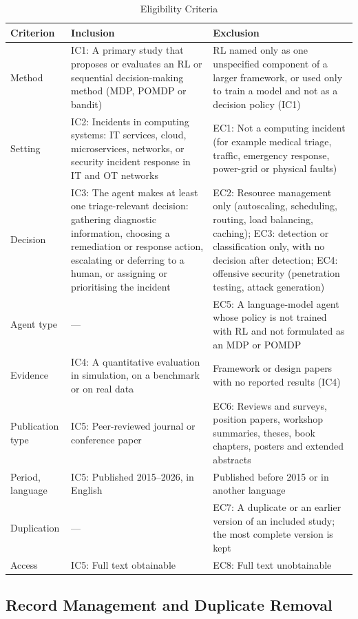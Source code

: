 \documentclass[journal]{IEEEtran}
\begin{document}
\begin{table}[!t]
\centering
\caption{Eligibility Criteria}
\label{tab:criteria}
\footnotesize
\begin{tabularx}{\textwidth}{@{}p{1.3cm}LL@{}}
\toprule
Criterion & Inclusion & Exclusion \\
\midrule
Method & IC1: A primary study that proposes or evaluates an RL or sequential decision-making method (MDP, POMDP or bandit) & RL named only as one unspecified component of a larger framework, or used only to train a model and not as a decision policy (IC1) \\
Setting & IC2: Incidents in computing systems: IT services, cloud, microservices, networks, or security incident response in IT and OT networks & EC1: Not a computing incident (for example medical triage, traffic, emergency response, power-grid or physical faults) \\
Decision & IC3: The agent makes at least one triage-relevant decision: gathering diagnostic information, choosing a remediation or response action, escalating or deferring to a human, or assigning or prioritising the incident & EC2: Resource management only (autoscaling, scheduling, routing, load balancing, caching); EC3: detection or classification only, with no decision after detection; EC4: offensive security (penetration testing, attack generation) \\
Agent type & --- & EC5: A language-model agent whose policy is not trained with RL and not formulated as an MDP or POMDP \\
Evidence & IC4: A quantitative evaluation in simulation, on a benchmark or on real data & Framework or design papers with no reported results (IC4) \\
Publication type & IC5: Peer-reviewed journal or conference paper & EC6: Reviews and surveys, position papers, workshop summaries, theses, book chapters, posters and extended abstracts \\
Period, language & IC5: Published 2015--2026, in English & Published before 2015 or in another language \\
Duplication & --- & EC7: A duplicate or an earlier version of an included study; the most complete version is kept \\
Access & IC5: Full text obtainable & EC8: Full text unobtainable \\
\bottomrule
\end{tabularx}
\end{table}

\subsection{Record Management and Duplicate Removal}
\end{document}
